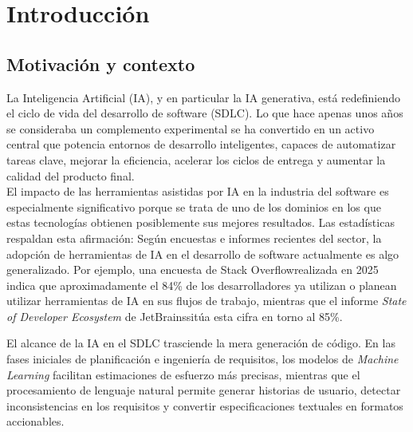 
\cleardoublepage
\chapter{Introducción} \label{chap:Introduccion}

\section{Motivación y contexto} \label{sec:motivacion}

La Inteligencia Artificial (\ac{IA}), y en particular la \ac{IA} generativa, está redefiniendo el ciclo de vida del desarrollo de software (\ac{SDLC}). Lo que hace apenas unos años se consideraba un complemento experimental se ha convertido en un activo central que potencia entornos de desarrollo inteligentes, capaces de automatizar tareas clave, mejorar la eficiencia, acelerar los ciclos de entrega y aumentar la calidad del producto final.\\

El impacto de las herramientas asistidas por \ac{IA} en la industria del software es especialmente significativo porque se trata de uno de los dominios en los que estas tecnologías obtienen posiblemente sus mejores resultados. Las estadísticas respaldan esta afirmación: Según encuestas e informes recientes del sector\footnotemark[1] \footnotemark[2], la adopción de herramientas de \ac{IA} en el desarrollo de software actualmente es algo generalizado. Por ejemplo, una encuesta de Stack Overflow\footnotemark[1] realizada en 2025 indica que aproximadamente el 84\% de los desarrolladores ya utilizan o planean utilizar herramientas de \ac{IA} en sus flujos de trabajo, mientras que el informe \textit{State of Developer Ecosystem} de JetBrains\footnotemark[2] sitúa esta cifra en torno al 85\%.\\


El alcance de la \ac{IA} en el \ac{SDLC} trasciende la mera generación de código. En las fases iniciales de planificación e ingeniería de requisitos, los modelos de \textit{Machine Learning} facilitan estimaciones de esfuerzo más precisas, mientras que el procesamiento de lenguaje natural permite generar historias de usuario, detectar inconsistencias en los requisitos y convertir especificaciones textuales en formatos accionables.\\

